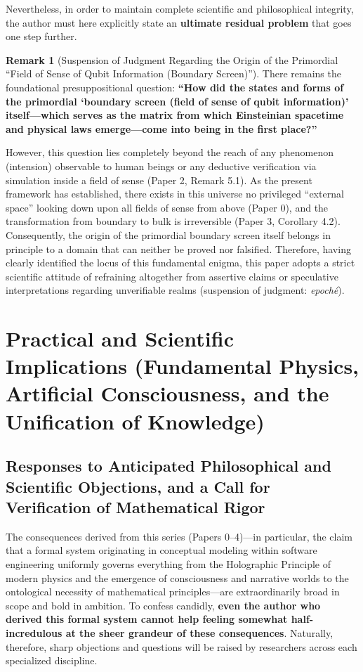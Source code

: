 \documentclass[11pt,a4paper]{article}
\theoremstyle{definition}
\newtheorem{remark}{Remark}[section]
\theoremstyle{plain}
\begin{document}
Nevertheless, in order to maintain complete scientific and philosophical integrity, the author must here explicitly state an \textbf{ultimate residual problem} that goes one step further.

\begin{remark}[Suspension of Judgment Regarding the Origin of the Primordial ``Field of Sense of Qubit Information (Boundary Screen)'']
There remains the foundational presuppositional question: \textbf{``How did the states and forms of the primordial `boundary screen (field of sense of qubit information)' itself---which serves as the matrix from which Einsteinian spacetime and physical laws emerge---come into being in the first place?''}

However, this question lies completely beyond the reach of any phenomenon (intension) observable to human beings or any deductive verification via simulation inside a field of sense (Paper 2, Remark 5.1). As the present framework has established, there exists in this universe no privileged ``external space'' looking down upon all fields of sense from above (Paper 0), and the transformation from boundary to bulk is irreversible (Paper 3, Corollary 4.2). Consequently, the origin of the primordial boundary screen itself belongs in principle to a domain that can neither be proved nor falsified. Therefore, having clearly identified the locus of this fundamental enigma, this paper adopts a strict scientific attitude of refraining altogether from assertive claims or speculative interpretations regarding unverifiable realms (suspension of judgment: \textit{epoch\'e}).
\end{remark}

\section{Practical and Scientific Implications (Fundamental Physics, Artificial Consciousness, and the Unification of Knowledge)}

\subsection{Responses to Anticipated Philosophical and Scientific Objections, and a Call for Verification of Mathematical Rigor}
The consequences derived from this series (Papers 0--4)---in particular, the claim that a formal system originating in conceptual modeling within software engineering uniformly governs everything from the Holographic Principle of modern physics and the emergence of consciousness and narrative worlds to the ontological necessity of mathematical principles---are extraordinarily broad in scope and bold in ambition. To confess candidly, \textbf{even the author who derived this formal system cannot help feeling somewhat half-incredulous at the sheer grandeur of these consequences}. Naturally, therefore, sharp objections and questions will be raised by researchers across each specialized discipline.
\end{document}
